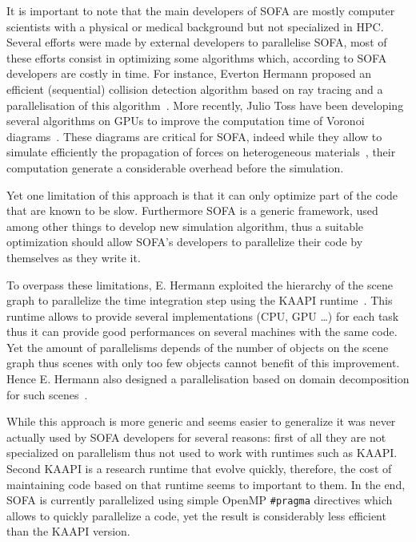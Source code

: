 It is important to note that the main developers of \gls{SOFA} are  mostly computer scientists with a physical or medical background but not specialized in \gls{HPC}.
Several efforts were made by external developers to parallelise \gls{SOFA}, most of these efforts consist in optimizing some algorithms which, according to \gls{SOFA} developers are costly in time.
For instance, Everton Hermann proposed an efficient (sequential) collision detection algorithm based on ray tracing and a parallelisation of this algorithm~\cite{Hermann08Raytraced}.
More recently, Julio Toss have been developing several algorithms on \glspl{GPU} to improve the computation time of Voronoi diagrams~\cite{Toss13Parallel,Toss14Parallel}.
These diagrams are critical for \gls{SOFA}, indeed while they allow to simulate efficiently the propagation of forces on heterogeneous materials~\cite{Faure11Sparse}, their computation generate a considerable overhead before the simulation.

Yet one limitation of this approach is that it can only optimize part of the code that are known to be slow.
Furthermore \gls{SOFA} is a generic framework, used among other things to develop new simulation algorithm, thus a suitable optimization should allow \gls{SOFA}'s developers to parallelize their code by themselves as they write it.

To overpass these limitations, E. Hermann exploited the hierarchy of the scene graph to parallelize the time integration step using the \gls{KAAPI} runtime~\cite{Gautier07KAAPI}.
This runtime allows to provide several implementations (\gls{CPU}, \gls{GPU} \ldots) for each task thus it can provide good performances on several machines with the same code.
Yet the amount of parallelisms depends of the number of objects on the scene graph thus scenes with only too few objects cannot benefit of this improvement.
Hence E. Hermann also designed a parallelisation based on domain decomposition for such scenes~\cite{Hermann09Interactive}.

While this approach is more generic and seems easier to generalize it was never actually used by \gls{SOFA} developers for several reasons: first of all they are not specialized on parallelism thus not used to work with runtimes such as \gls{KAAPI}.
Second \gls{KAAPI} is a research runtime that evolve quickly, therefore, the cost of maintaining code based on that runtime seems to important to them.
In the end, \gls{SOFA} is currently parallelized using simple \gls{OpenMP} \texttt{\#pragma} directives which allows to quickly parallelize a code, yet the result is considerably less efficient than the \gls{KAAPI} version.

